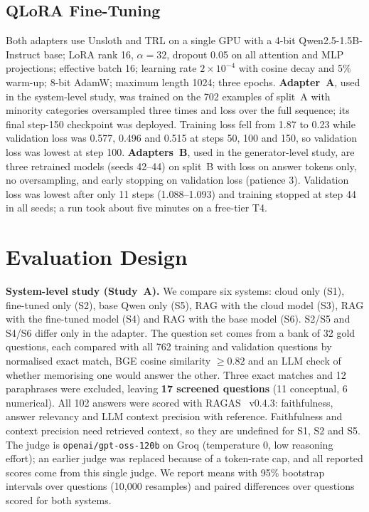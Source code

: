 \documentclass[conference]{IEEEtran}
\begin{document}
\subsection{QLoRA Fine-Tuning}
Both adapters use Unsloth and TRL on a single GPU with a 4-bit Qwen2.5-1.5B-Instruct base; LoRA rank 16, $\alpha=32$, dropout 0.05 on all attention and MLP projections; effective batch 16; learning rate $2\times10^{-4}$ with cosine decay and 5\% warm-up; 8-bit AdamW; maximum length 1024; three epochs. \textbf{Adapter~A}, used in the system-level study, was trained on the 702 examples of split~A with minority categories oversampled three times and loss over the full sequence; its final step-150 checkpoint was deployed. Training loss fell from 1.87 to 0.23 while validation loss was 0.577, 0.496 and 0.515 at steps 50, 100 and 150, so validation loss was lowest at step 100. \textbf{Adapters~B}, used in the generator-level study, are three retrained models (seeds 42--44) on split~B with loss on answer tokens only, no oversampling, and early stopping on validation loss (patience 3). Validation loss was lowest after only 11 steps (1.088--1.093) and training stopped at step 44 in all seeds; a run took about five minutes on a free-tier T4.

\section{Evaluation Design}\label{sec:eval}

\textbf{System-level study (Study~A).} We compare six systems: cloud only (S1), fine-tuned only (S2), base Qwen only (S5), RAG with the cloud model (S3), RAG with the fine-tuned model (S4) and RAG with the base model (S6). S2/S5 and S4/S6 differ only in the adapter. The question set comes from a bank of 32 gold questions, each compared with all 762 training and validation questions by normalised exact match, BGE cosine similarity $\ge0.82$ and an LLM check of whether memorising one would answer the other. Three exact matches and 12 paraphrases were excluded, leaving \textbf{17 screened questions} (11 conceptual, 6 numerical). All 102 answers were scored with RAGAS~\cite{es2024ragas} v0.4.3: faithfulness, answer relevancy and LLM context precision with reference. Faithfulness and context precision need retrieved context, so they are undefined for S1, S2 and S5. The judge is \texttt{openai/gpt-oss-120b} on Groq (temperature 0, low reasoning effort); an earlier judge was replaced because of a token-rate cap, and all reported scores come from this single judge. We report means with 95\% bootstrap intervals over questions (10{,}000 resamples) and paired differences over questions scored for both systems.
\end{document}
